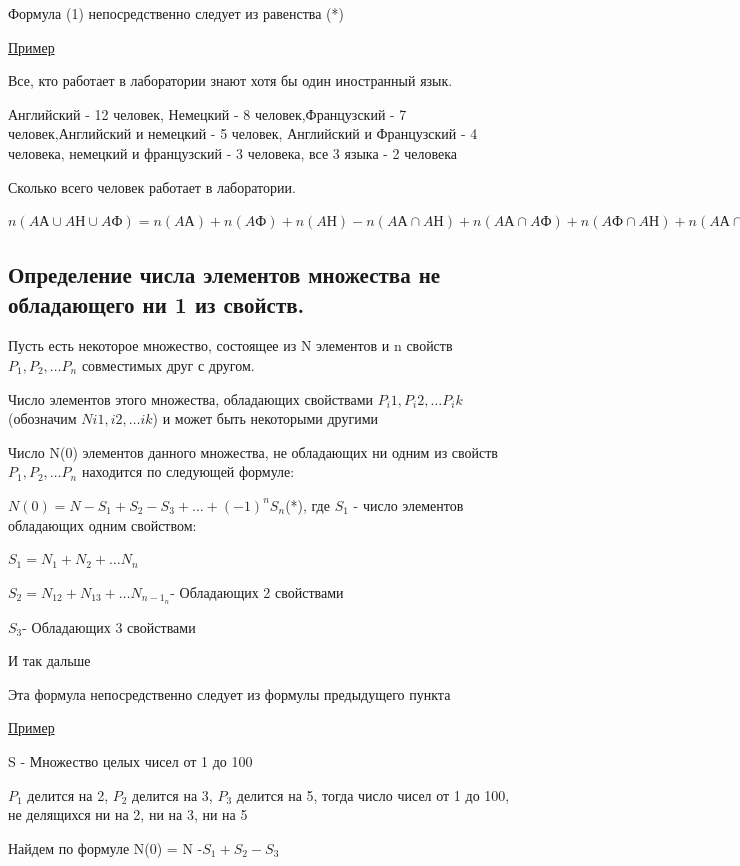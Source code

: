 \documentclass[12pt, a4paper, oneside]{article}
\theoremstyle{plain} %
\theoremstyle{definition}
\begin{document}
Формула (1) непосредственно следует из равенства (*)

\underline{Пример}

Все, кто работает в лаборатории знают хотя бы один иностранный язык.

Английский - 12 человек, Немецкий - 8 человек,Французский - 7 человек,Английский и немецкий - 5 человек, Английский и Французский - 4 человека, немецкий и французский - 3 человека, все 3 языка - 2 человека

Сколько всего человек работает в лаборатории.

$n(A\text{А}\cup A\text{Н} \cup A\text{Ф} ) = n(A\text{А}) + n(A\text{Ф}) + n(A\text{Н}) - n(A\text{А}\cap A\text{Н}) + n(A\text{А}\cap A\text{Ф})+
n(A\text{Ф}\cap A\text{Н}) + n(A\text{А}\cap A\text{Н}\cap A\text{Ф}) = 12 + 8 + 7 -(5 + 4 +3) + 2 = 29 - 12 = 17$

\subsection{Определение числа элементов множества не обладающего ни 1 из свойств.}

Пусть есть некоторое множество, состоящее из N элементов и n свойств  $P_1,P_2,\dots P_n$ совместимых друг с другом.

Число элементов этого множества, обладающих свойствами $P_i1,P_i2,\dots P_ik$(обозначим $N i1,i2,\dots ik$) и может быть некоторыми другими

Число N(0) элементов данного множества, не обладающих ни одним из свойств $P_1,P_2, \dots P_n$ находится по следующей формуле:

$N(0)= N - S_1 + S_2 - S_3 + \dots +(-1)^n S_n$(*), где 
$S_1$
- число элементов обладающих одним свойством:

$S_1 = N_1 + N_2 + \dots N_n$

$S_2 = N_12 + N_13 + \dots N_{{n-1}_n}$- Обладающих 2 свойствами

$S_3$- Обладающих 3 свойствами

И так дальше

Эта формула непосредственно следует из формулы предыдущего пункта

\underline{Пример}

S - Множество целых чисел от 1 до 100 

$P_1$ делится на 2, $P_2$ делится на 3, $P_3$ делится на 5, тогда число чисел от 1 до 100, не делящихся ни на 2, ни на 3, ни на 5

Найдем по формуле N(0) = N -$S_1 + S_2 - S_3$
\end{document}
